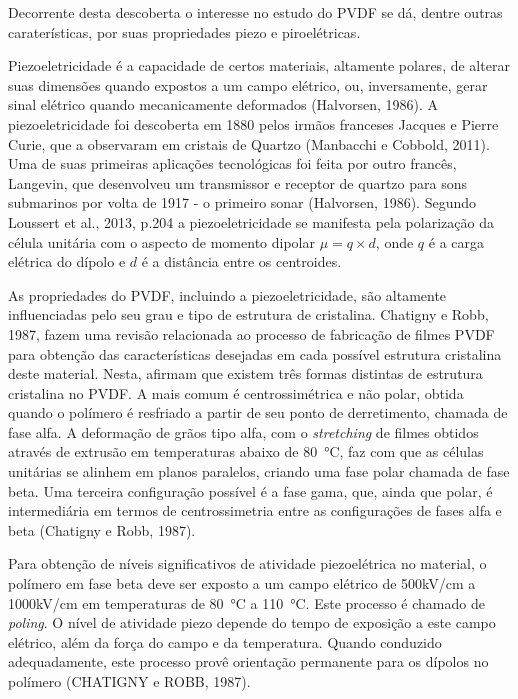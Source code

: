 \documentclass[
	12pt,				
	oneside,			
	a4paper,			
	english,			
	brazil,			
	]{abntex2ppgsi}
\begin{document}
Decorrente desta descoberta o interesse no estudo do PVDF se dá, dentre outras caraterísticas, por suas propriedades piezo e piroelétricas. 

Piezoeletricidade é a capacidade de certos materiais, altamente polares, de alterar suas dimensões quando expostos a um campo elétrico, ou, inversamente, gerar sinal elétrico quando mecanicamente deformados (Halvorsen, 1986). A piezoeletricidade foi descoberta em 1880 pelos irmãos franceses Jacques e Pierre Curie, que a observaram em cristais de Quartzo (Manbacchi e Cobbold, 2011). Uma de suas primeiras aplicações tecnológicas foi feita por outro francês, Langevin, que desenvolveu um transmissor e receptor de quartzo para sons submarinos por volta de 1917 - o primeiro sonar (Halvorsen, 1986). Segundo Loussert et al., 2013, p.204 a piezoeletricidade se manifesta pela polarização da célula unitária com o aspecto de momento dipolar $\mu = q\times d$, onde $q$ é a carga elétrica do dípolo e $d$ é a distância entre os centroides.  

As propriedades do PVDF, incluindo a piezoeletricidade, são altamente influenciadas pelo seu grau e tipo de estrutura de cristalina. Chatigny e Robb, 1987, fazem uma revisão relacionada ao processo de fabricação de filmes PVDF para obtenção das características desejadas em cada possível estrutura cristalina deste material. Nesta, afirmam que existem três formas distintas de estrutura cristalina no PVDF. A mais comum é centrossimétrica e não polar, obtida quando o polímero é resfriado a partir de seu ponto de derretimento, chamada de fase alfa. A deformação de grãos tipo alfa, com o \textit{stretching} de filmes obtidos através de extrusão em temperaturas abaixo de \SI{80}{\celsius}, faz com que as células unitárias se alinhem em planos paralelos, criando uma fase polar chamada de fase beta. Uma terceira configuração possível é a fase gama, que, ainda que polar, é intermediária em termos de centrossimetria entre as configurações de fases alfa e beta (Chatigny e Robb, 1987).

Para obtenção de níveis significativos de atividade piezoelétrica no material, o polímero em fase beta deve ser exposto a um campo elétrico de 500kV/cm a 1000kV/cm em temperaturas de \SI{80}{\celsius} a \SI{110}{\celsius}. Este processo é chamado de \textit{poling}. O nível de atividade piezo depende do tempo de exposição a este campo elétrico, além da força do campo e da temperatura. Quando conduzido adequadamente, este processo provê orientação permanente para os dípolos no polímero (CHATIGNY e ROBB, 1987). 
\end{document}
